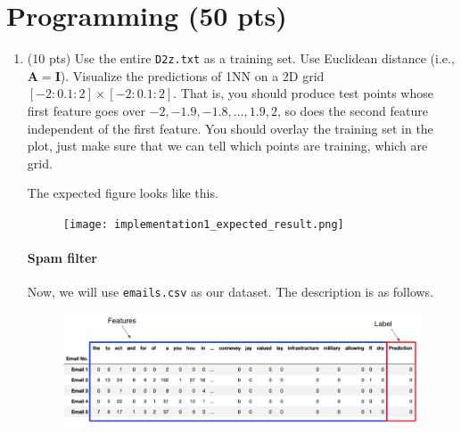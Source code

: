 \documentclass[a4paper]{article}
\theoremstyle{definition}
\renewcommand\vec[1]{\mathbf{#1}}
\begin{document}
\section{Programming (50 pts)}
\begin{enumerate}
  \item (10 pts) Use the entire {\tt D2z.txt} as a training set.  Use Euclidean distance (i.e., $\vec A=\vec I$).
        Visualize the predictions of 1NN on a 2D grid $[-2:0.1:2]\times [-2:0.1:2]$.
        That is, you should produce test points whose first feature goes over $-2, -1.9, -1.8, \ldots, 1.9, 2$, so does the second feature independent of the first feature.
        You should overlay the training set in the plot, just make sure that we can tell which points are training, which are grid.

        The expected figure looks like this.
        \begin{figure}[h]
          \centering
          \texttt{[image: implementation1\_expected\_result.png]}
        \end{figure}

        \paragraph{Spam filter} Now, we will use {\tt emails.csv} as our dataset. The description is as follows.
        \begin{figure}[h]
          \centering
          \includegraphics[width=18cm]{email_head.png}
        \end{figure}


\end{enumerate}
\end{document}
